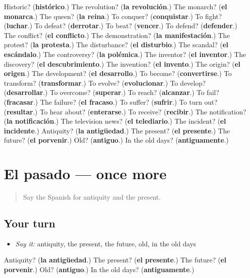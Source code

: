 \begin{tcolorbox}[breakable,colback=teal!4,colframe=teal!35!black,title={Before you move on}]
Historic? (\textbf{histórico}.) The revolution? (\textbf{la revolución}.) The monarch? (\textbf{el monarca}.) The queen? (\textbf{la reina}.) To conquer? (\textbf{conquistar}.) To fight? (\textbf{luchar}.) To defeat? (\textbf{derrotar}.) To beat? (\textbf{vencer}.) To defend? (\textbf{defender}.) The conflict? (\textbf{el conflicto}.) The demonstration? (\textbf{la manifestación}.) The protest? (\textbf{la protesta}.) The disturbance? (\textbf{el disturbio}.) The scandal? (\textbf{el escándalo}.) The controversy? (\textbf{la polémica}.) The inventor? (\textbf{el inventor}.) The discovery? (\textbf{el descubrimiento}.) The invention? (\textbf{el invento}.) The origin? (\textbf{el origen}.) The development? (\textbf{el desarrollo}.) To become? (\textbf{convertirse}.) To transform? (\textbf{transformar}.) To evolve? (\textbf{evolucionar}.) To develop? (\textbf{desarrollar}.) To overcome? (\textbf{superar}.) To reach? (\textbf{alcanzar}.) To fail? (\textbf{fracasar}.) The failure? (\textbf{el fracaso}.) To suffer? (\textbf{sufrir}.) To turn out? (\textbf{resultar}.) To hear about? (\textbf{enterarse}.) To receive? (\textbf{recibir}.) The notification? (\textbf{la notificación}.) The television news? (\textbf{el telediario}.) The incident? (\textbf{el incidente}.) Antiquity? (\textbf{la antigüedad}.) The present? (\textbf{el presente}.) The future? (\textbf{el porvenir}.) Old? (\textbf{antiguo}.) In the old days? (\textbf{antiguamente}.)
\end{tcolorbox}
\section[(dialogue)]{El pasado — once more}

\label{lesson:ES-R575-repaso-final-575}



\begin{quote}
Say the Spanish for antiquity and the present.
\end{quote}

\subsection*{Your turn}
\begin{itemize}
\raggedright
  \item \emph{Say it:} antiquity, the present, the future, old, in the old days
\end{itemize}

\begin{tcolorbox}[breakable,colback=teal!4,colframe=teal!35!black,title={Before you move on}]
Antiquity? (\textbf{la antigüedad}.) The present? (\textbf{el presente}.) The future? (\textbf{el porvenir}.) Old? (\textbf{antiguo}.) In the old days? (\textbf{antiguamente}.)
\end{tcolorbox}
